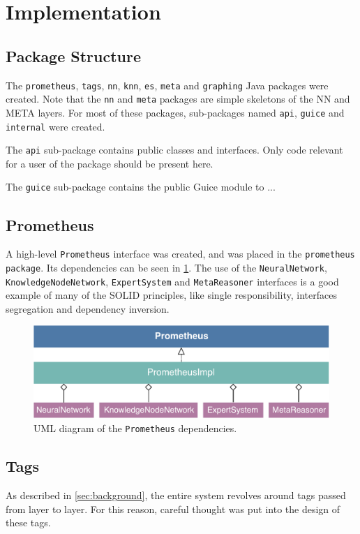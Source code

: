 \documentclass[titlepage,11pt]{article}
\newcommand{\code}[1]{\texttt{#1}}
\begin{document}
\section{Implementation}
\label{sec:implementation}

\subsection{Package Structure}
The \code{prometheus}, \code{tags}, \code{nn}, \code{knn}, \code{es}, \code{meta} and \code{graphing} Java packages were created. Note that the \code{nn} and \code{meta} packages are simple skeletons of the NN and META layers. For most of these packages, sub-packages named \code{api}, \code{guice} and \code{internal} were created.

The \code{api} sub-package contains public classes and interfaces. Only code relevant for a user of the package should be present here.

The \code{guice} sub-package contains the public Guice module to ...


\subsection{Prometheus}
A high-level \code{Prometheus} interface was created, and was placed in the \code{prometheus package}. Its dependencies can be seen in \cref{fig:uml_prometheus}. The use of the \code{NeuralNetwork}, \code{KnowledgeNodeNetwork}, \code{ExpertSystem} and \code{MetaReasoner} interfaces is a good example of many of the SOLID principles, like single responsibility, interfaces segregation and dependency inversion.

\begin{figure}[!htb]
	\includegraphics[width=\columnwidth]{figures/uml_prometheus.pdf}
	\caption{UML diagram of the \code{Prometheus} dependencies.}
	\label{fig:uml_prometheus}
\end{figure}


\subsection{Tags}
As described in \autoref{sec:background}, the entire system revolves around tags passed from layer to layer. For this reason, careful thought was put into the design of these tags.
\end{document}
